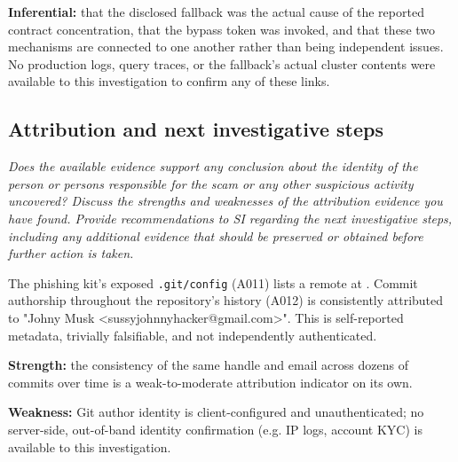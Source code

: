 \documentclass[11pt,a4paper,final,oneside]{article}
\begin{document}
\textbf{Inferential:} that the disclosed fallback was the actual cause of the reported contract
concentration, that the bypass token was invoked, and that these two mechanisms are connected to
one another rather than being independent issues. No production logs, query traces, or the
fallback's actual cluster contents were available to this investigation to confirm any of these
links.

\subsection{Attribution and next investigative steps}

\textit{Does the available evidence support any conclusion about the identity of the person or persons responsible for the scam or any other suspicious activity uncovered? Discuss the strengths and weaknesses of the attribution evidence you have found. Provide recommendations to SI regarding the next investigative steps, including any additional evidence that should be preserved or obtained before further action is taken.
}


The phishing kit's exposed \texttt{.git/config} (A011) lists a remote at
. Commit authorship throughout the repository's history
(A012) is consistently attributed to "Johny Musk <sussyjohnnyhacker@gmail.com>". This is
self-reported metadata, trivially falsifiable, and not independently authenticated.

\textbf{Strength:} the consistency of the same handle and email across dozens of commits over
time is a weak-to-moderate attribution indicator on its own.

\textbf{Weakness:} Git author identity is client-configured and unauthenticated; no
server-side, out-of-band identity confirmation (e.g. IP logs, account KYC) is available to this
investigation.
\end{document}
